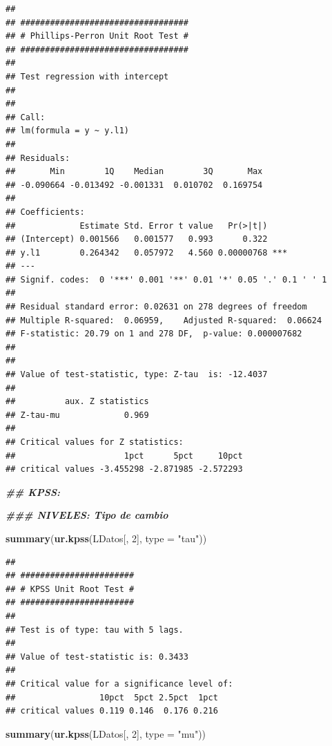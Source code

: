 \documentclass[
]{book}
\newenvironment{Shaded}{\begin{snugshade}}{\end{snugshade}}
\newcommand{\AttributeTok}[1]{\textcolor[rgb]{0.13,0.29,0.53}{#1}}
\newcommand{\DecValTok}[1]{\textcolor[rgb]{0.00,0.00,0.81}{#1}}
\newcommand{\DocumentationTok}[1]{\textcolor[rgb]{0.56,0.35,0.01}{\textbf{\textit{#1}}}}
\newcommand{\FunctionTok}[1]{\textcolor[rgb]{0.13,0.29,0.53}{\textbf{#1}}}
\newcommand{\NormalTok}[1]{#1}
\newcommand{\StringTok}[1]{\textcolor[rgb]{0.31,0.60,0.02}{#1}}
\begin{document}
\begin{verbatim}
## 
## ################################## 
## # Phillips-Perron Unit Root Test # 
## ################################## 
## 
## Test regression with intercept 
## 
## 
## Call:
## lm(formula = y ~ y.l1)
## 
## Residuals:
##       Min        1Q    Median        3Q       Max 
## -0.090664 -0.013492 -0.001331  0.010702  0.169754 
## 
## Coefficients:
##             Estimate Std. Error t value   Pr(>|t|)    
## (Intercept) 0.001566   0.001577   0.993      0.322    
## y.l1        0.264342   0.057972   4.560 0.00000768 ***
## ---
## Signif. codes:  0 '***' 0.001 '**' 0.01 '*' 0.05 '.' 0.1 ' ' 1
## 
## Residual standard error: 0.02631 on 278 degrees of freedom
## Multiple R-squared:  0.06959,    Adjusted R-squared:  0.06624 
## F-statistic: 20.79 on 1 and 278 DF,  p-value: 0.000007682
## 
## 
## Value of test-statistic, type: Z-tau  is: -12.4037 
## 
##          aux. Z statistics
## Z-tau-mu             0.969
## 
## Critical values for Z statistics: 
##                      1pct      5pct     10pct
## critical values -3.455298 -2.871985 -2.572293
\end{verbatim}

\begin{Shaded}
\begin{Highlighting}[]
\DocumentationTok{\#\# KPSS: }

\DocumentationTok{\#\#\# NIVELES: Tipo de cambio}

\FunctionTok{summary}\NormalTok{(}\FunctionTok{ur.kpss}\NormalTok{(LDatos[, }\DecValTok{2}\NormalTok{], }\AttributeTok{type =} \StringTok{"tau"}\NormalTok{))}
\end{Highlighting}
\end{Shaded}

\begin{verbatim}
## 
## ####################### 
## # KPSS Unit Root Test # 
## ####################### 
## 
## Test is of type: tau with 5 lags. 
## 
## Value of test-statistic is: 0.3433 
## 
## Critical value for a significance level of: 
##                 10pct  5pct 2.5pct  1pct
## critical values 0.119 0.146  0.176 0.216
\end{verbatim}

\begin{Shaded}
\begin{Highlighting}[]
\FunctionTok{summary}\NormalTok{(}\FunctionTok{ur.kpss}\NormalTok{(LDatos[, }\DecValTok{2}\NormalTok{], }\AttributeTok{type =} \StringTok{"mu"}\NormalTok{))}
\end{Highlighting}
\end{Shaded}
\end{document}
